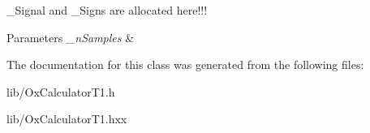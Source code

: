 \-\_\-\-Signal and \-\_\-\-Signs are allocated here!!! 
\begin{DoxyParams}{Parameters}
{\em \-\_\-n\-Samples} & \\
\hline
\end{DoxyParams}


The documentation for this class was generated from the following files\-:\begin{DoxyCompactItemize}
\item 
lib/Ox\-Calculator\-T1.\-h\item 
lib/Ox\-Calculator\-T1.\-hxx\end{DoxyCompactItemize}
